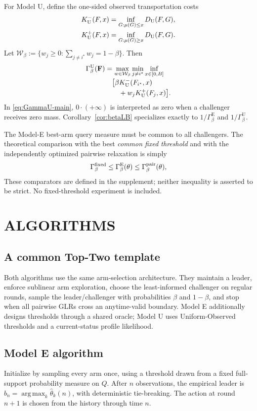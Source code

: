 \documentclass[twoside]{article}
\theoremstyle{definition}
\newcommand{\1}{\mathbf 1}
\newcommand{\argmax}{\operatorname*{arg\,max}}
\newcommand{\GammaE}{\Gamma_{\beta}^{\mathrm E}}
\newcommand{\GammaU}{\Gamma_{\beta}^{\mathrm U}}
\begin{document}
For Model U, define the one-sided observed transportation costs
\begin{align*}
K_{\rm U}^-(F,x)&=\inf_{G:\mu(G)\le x}D_{\rm U}(F,G),\\
K_{\rm U}^+(F,x)&=\inf_{G:\mu(G)\ge x}D_{\rm U}(F,G).
\end{align*}
Let $\mathcal W_\beta:=\{w_j\ge0:\sum_{j\ne i^\star}w_j=1-\beta\}$.
Then
\begin{equation}
\begin{aligned}
\GammaU(\mathbf F)
&=\max_{w\in\mathcal W_\beta}
\min_{j\ne i^\star}\inf_{x\in[0,B]}\\[-2pt]
&\quad\bigl[\beta K_{\rm U}^-(F_{i^\star},x)\\[-1pt]
&\qquad+w_jK_{\rm U}^+(F_j,x)\bigr].
\end{aligned}
\label{eq:GammaU-main}
\end{equation}
In \eqref{eq:GammaU-main}, $0\cdot(+\infty)$ is interpreted as zero
when a challenger receives zero mass.
Corollary~\ref{cor:betaLB} specializes exactly to $1/\GammaE$ and $1/\GammaU$.


The Model-E best-arm query measure must be common to all challengers.
The theoretical comparison with the best \emph{common fixed threshold} and
with the independently optimized pairwise relaxation is simply
\[
\Gamma_\beta^{\rm fixed}\le\GammaE(\theta)
\le\Gamma_\beta^{\rm pair}(\theta),
\]
These comparators are defined in the supplement; neither inequality
is asserted to be strict. No fixed-threshold experiment is included.

\section{ALGORITHMS}
\label{sec:alg}
\subsection{A common Top-Two template}
Both algorithms use the same arm-selection architecture.  They maintain a
leader, enforce sublinear arm exploration, choose the least-informed
challenger on regular rounds, sample the leader/challenger with probabilities
$\beta$ and $1-\beta$, and stop when all pairwise GLRs cross an anytime-valid
boundary.  Model E additionally designs thresholds through a shared oracle;
Model U uses Uniform-Observed thresholds and a current-status profile
likelihood.



\subsection{Model E algorithm}
Initialize by sampling every arm once, using a threshold drawn from a fixed
full-support probability measure on $Q$.  After $n$ observations, the empirical leader is
$\widehat b_n=\argmax_k\widehat\theta_k(n)$, with deterministic
tie-breaking.  The action at round $n+1$ is chosen from the history through
time $n$.
\end{document}
